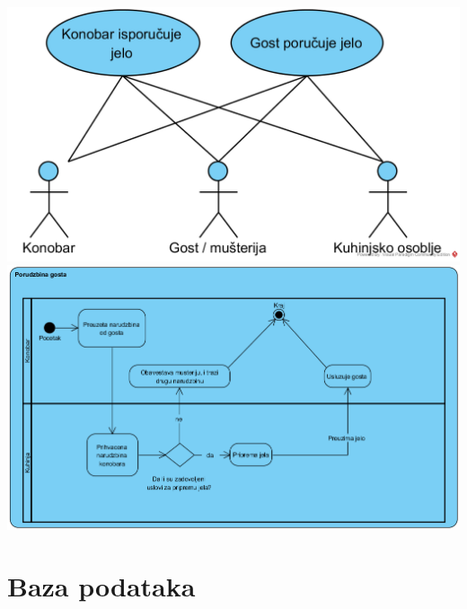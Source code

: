 \documentclass{article}
\begin{document}
  \includegraphics[width=\textwidth]{SU_7_konobar_kuhinja.png}
  \includegraphics[width=\textwidth]{SU_7_porudzbina.png}
\pagebreak


\section{Baza podataka}
\end{document}
